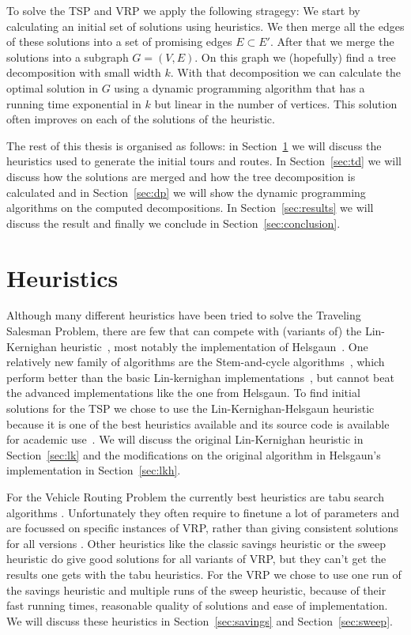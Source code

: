 \documentclass[12pt]{article}
\begin{document}
To solve the TSP and VRP we apply the following stragegy: We start by calculating an initial set of
solutions using heuristics. We then merge all the edges of these solutions into a set of promising
edges $E \subset E'$. After that we merge the solutions into a subgraph $G = (V, E)$. On this graph
we (hopefully) find a tree decomposition with small width $k$. With that decomposition we can
calculate the optimal solution in $G$ using a dynamic programming algorithm that has a running time
exponential in $k$ but linear in the number of vertices. This solution often improves on each of the
solutions of the heuristic.

The rest of this thesis is organised as follows: in Section~\ref{sec:heuristics} we will discuss the
heuristics used to generate the initial tours and routes. In Section~\ref{sec:td} we will discuss how
the solutions are merged and how the tree decomposition is calculated and in Section~\ref{sec:dp} we will
show the dynamic programming algorithms on the computed decompositions. In Section~\ref{sec:results}
we will discuss the result and finally we conclude in Section~\ref{sec:conclusion}.



%
%
\section{Heuristics}
\label{sec:heuristics}
Although many different heuristics have been tried to solve the Traveling Salesman Problem, there
are few that can compete with (variants of) the Lin-Kernighan heuristic~\cite{lkh1, vrp-summary-1},
most notably the implementation of Helsgaun~\cite{lkh2}.
One relatively new family of algorithms are the Stem-and-cycle algorithms~\cite{stem-cycle-1,
stem-cycle-2, tsp-summary}, which perform better than the basic Lin-kernighan
implementations~\cite{tsp-summary}, but cannot beat the advanced implementations like the one from
Helsgaun.
To find initial solutions for the TSP we chose to use the Lin-Kernighan-Helsgaun heuristic
because it is one of the best heuristics available and its source code is available for academic
use~\cite{lkh-url}. We will discuss the original Lin-Kernighan heuristic in Section~\ref{sec:lk} and
the modifications on the original algorithm in Helsgaun's implementation in Section~\ref{sec:lkh}.

For the Vehicle Routing Problem the currently best heuristics are tabu search algorithms
\cite{vrp-summary-1, vrp-summary-2}. Unfortunately they often require to finetune a lot of
parameters and are focussed on specific instances of VRP, rather than giving consistent solutions
for all versions \cite{vrp-summary-1}. Other heuristics like the classic savings heuristic or the
sweep heuristic do give good solutions for all variants of VRP, but they can't get the results one
gets with the tabu heuristics.
For the VRP we chose to use one run of the savings heuristic and multiple runs of the sweep
heuristic, because of their fast running times, reasonable quality of solutions and ease of
implementation. We will discuss these heuristics in Section~\ref{sec:savings} and
Section~\ref{sec:sweep}.
\end{document}
